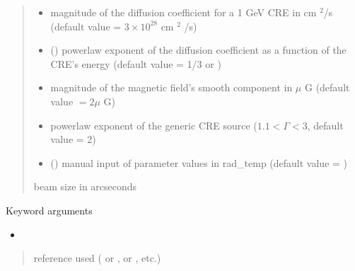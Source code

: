 \documentclass[letterpaper,10pt,english]{sphinxmanual}
\begin{document}
\begin{fulllineitems}
\begin{quote}
\begin{description}
\begin{itemize}
\item {} 
\sphinxAtStartPar
{} \textendash{} magnitude of the diffusion coefficient for a 1 GeV CRE in cm \({}^2\)/s (default value = \(3\times 10^{28}\) cm \({}^2\) /s)

\item {} 
\sphinxAtStartPar
{} (\sphinxstyleliteralemphasis{\sphinxupquote{, }}) \textendash{} power\sphinxhyphen{}law exponent of the diffusion coefficient as a function of the CRE’s energy (default value = 1/3 or )

\item {} 
\sphinxAtStartPar
{} \textendash{} magnitude of the magnetic field’s smooth component in \(\mu\) G (default value \(= 2 \mu\) G)

\item {} 
\sphinxAtStartPar
{} \textendash{} power\sphinxhyphen{}law exponent of the generic CRE source (\(1.1 < \Gamma < 3\), default value = 2)

\item {} 
\sphinxAtStartPar
{} () \textendash{} manual input of parameter values in rad\_temp (default value = )

\end{itemize}

\sphinxAtStartPar
beam size in arcseconds

\end{description}\end{quote}

\sphinxAtStartPar
Keyword arguments
\begin{itemize}
\item {} 
\sphinxAtStartPar
{}

\end{itemize}
\begin{quote}\begin{description}
\sphinxAtStartPar
{} \textendash{} reference used ( or \sphinxcode{\sphinxupquote{\textquotesingle{}1309.2641\textquotesingle{}}},  or \sphinxcode{\sphinxupquote{\textquotesingle{}1408.0002\textquotesingle{}}}, etc.)


\end{description}
\end{quote}
\end{fulllineitems}
\end{document}
